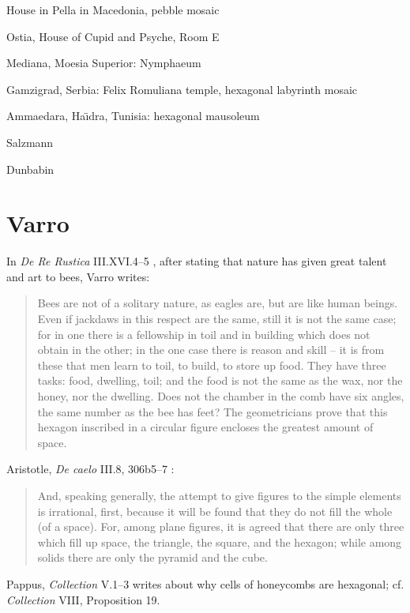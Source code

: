 \documentclass{article}
\theoremstyle{definition}
\begin{document}
House in Pella in Macedonia, pebble mosaic

Ostia, House of Cupid and Psyche, Room E \cite{ostiaIV}

Mediana, Moesia Superior: Nymphaeum

Gamzigrad, Serbia: Felix Romuliana temple, hexagonal labyrinth mosaic 

Ammaedara, Ha{\"\i}dra, Tunisia: hexagonal mausoleum

Salzmann \cite{salzmann}

Dunbabin \cite{dunbabin}





\section{Varro}
In {\em De Re Rustica} III.XVI.4--5 \cite[p.~501]{varro}, after stating that nature has given great talent and art to bees, Varro writes:
 
\begin{quote}
Bees are not of a solitary nature, as eagles are, but are like human beings. Even if jackdaws in this respect are the same, still it is not the same case; for in one there is a fellowship
in toil and in building which does not obtain in the other; in the one case there is reason and skill -- it is from these that men learn to toil, to build, to store up food. They have three 
tasks: food, dwelling, toil; and the food is not the same as the wax, nor the honey, nor the dwelling. Does not the chamber in the comb have six angles, the same number as the bee 
has feet? The geometricians prove that this hexagon inscribed in a circular figure encloses the greatest amount of space.
\end{quote}

Aristotle, {\em De caelo} III.8, 306b5--7 \cite[p.~177]{aristotle}:

\begin{quote}
And, speaking generally, the attempt to give figures to the simple
elements is irrational, first, because it will be found that they do
not fill the whole (of a space). For, among plane figures, it is agreed
that there are only three which fill up space, the triangle, the square,
and the hexagon; while among solids there are only the pyramid
and the cube.
\end{quote}


Pappus, {\em Collection} V.1--3 \cite[pp.~589--593]{thomasII} writes about why cells of honeycombs are hexagonal; cf.
{\em Collection} VIII, Proposition 19.
\end{document}
